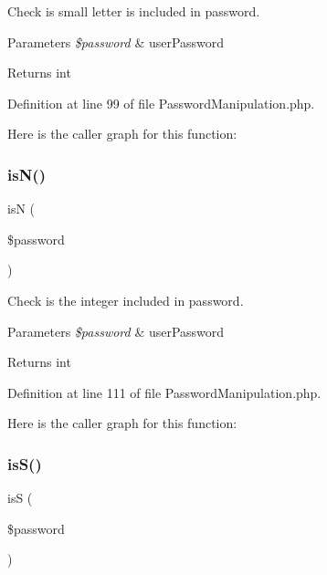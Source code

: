 Check is small letter is included in password.


\begin{DoxyParams}{Parameters}
{\em \$password} & user\+Password\\
\hline
\end{DoxyParams}
\begin{DoxyReturn}{Returns}
int 
\end{DoxyReturn}


Definition at line 99 of file Password\+Manipulation.\+php.

Here is the caller graph for this function\+:
\mbox{\label{class_zest_1_1_common_1_1_password_manipulation_a51b61dc4d9471a4bad70f55c63ec656c}} 
\subsubsection{\texorpdfstring{is\+N()}{isN()}}
{\footnotesize\ttfamily isN (\begin{DoxyParamCaption}\item[{}]{\$password }\end{DoxyParamCaption})}

Check is the integer included in password.


\begin{DoxyParams}{Parameters}
{\em \$password} & user\+Password\\
\hline
\end{DoxyParams}
\begin{DoxyReturn}{Returns}
int 
\end{DoxyReturn}


Definition at line 111 of file Password\+Manipulation.\+php.

Here is the caller graph for this function\+:
\mbox{\label{class_zest_1_1_common_1_1_password_manipulation_a68ce7a511fed2a4a564c121a6c32a4cd}} 
\subsubsection{\texorpdfstring{is\+S()}{isS()}}
{\footnotesize\ttfamily isS (\begin{DoxyParamCaption}\item[{}]{\$password }\end{DoxyParamCaption})}

